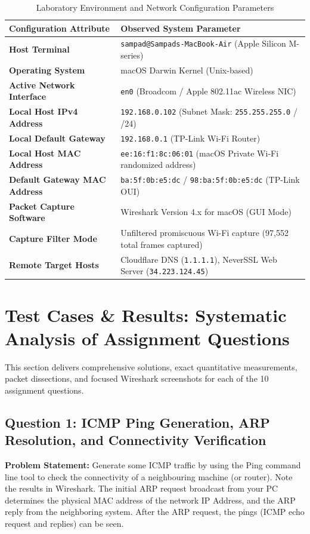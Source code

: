 \documentclass[11pt,a4paper]{article}
\begin{document}
\begin{table}[H]
\centering
\caption{Laboratory Environment and Network Configuration Parameters}
\label{tab:env_params}
\begin{tabularx}{\linewidth}{lX}
\toprule
\textbf{Configuration Attribute} & \textbf{Observed System Parameter} \\
\midrule
\textbf{Host Terminal} & \texttt{sampad@Sampads-MacBook-Air} (Apple Silicon M-series) \\
\textbf{Operating System} & macOS Darwin Kernel (Unix-based) \\
\textbf{Active Network Interface} & \texttt{en0} (Broadcom / Apple 802.11ac Wireless NIC) \\
\textbf{Local Host IPv4 Address} & \texttt{192.168.0.102} (Subnet Mask: \texttt{255.255.255.0} / /24) \\
\textbf{Local Default Gateway} & \texttt{192.168.0.1} (TP-Link Wi-Fi Router) \\
\textbf{Local Host MAC Address} & \texttt{ee:16:f1:8c:06:01} (macOS Private Wi-Fi randomized address) \\
\textbf{Default Gateway MAC Address} & \texttt{ba:5f:0b:e5:dc} / \texttt{98:ba:5f:0b:e5:dc} (TP-Link OUI) \\
\textbf{Packet Capture Software} & Wireshark Version 4.x for macOS (GUI Mode) \\
\textbf{Capture Filter Mode} & Unfiltered promiscuous Wi-Fi capture (97,552 total frames captured) \\
\textbf{Remote Target Hosts} & Cloudflare DNS (\texttt{1.1.1.1}), NeverSSL Web Server (\texttt{34.223.124.45}) \\
\bottomrule
\end{tabularx}
\end{table}

\section{Test Cases \& Results: Systematic Analysis of Assignment Questions}

This section delivers comprehensive solutions, exact quantitative measurements, packet dissections, and focused Wireshark screenshots for each of the 10 assignment questions.

\subsection{Question 1: ICMP Ping Generation, ARP Resolution, and Connectivity Verification}
\textbf{Problem Statement:} Generate some ICMP traffic by using the Ping command line tool to check the connectivity of a neighbouring machine (or router). Note the results in Wireshark. The initial ARP request broadcast from your PC determines the physical MAC address of the network IP Address, and the ARP reply from the neighboring system. After the ARP request, the pings (ICMP echo request and replies) can be seen.
\end{document}
